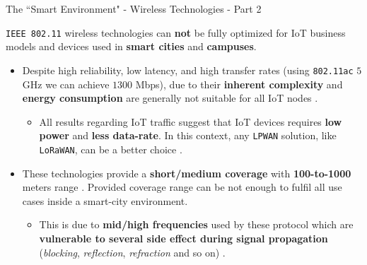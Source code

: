 \documentclass[13.5pt]{beamer}
\begin{document}
\begin{frame}{The ``Smart Environment" - Wireless Technologies - Part 2}

\begin{block}{}
\justifying

\texttt{IEEE 802.11} wireless technologies can \textbf{not} be fully optimized for IoT business models and devices used in \textbf{smart cities} and \textbf{campuses}.
\end{block}

\begin{itemize}
\justifying
\item Despite high reliability, low latency, and high transfer rates (using \texttt{802.11ac} $5$ GHz we can achieve $1300$ Mbps), due to their \textbf{inherent complexity} and \textbf{energy consumption} are generally not suitable for all IoT nodes \cite{IOTCITY}.

\begin{itemize}
\item All results regarding IoT traffic suggest that IoT devices requires \textbf{low power} and \textbf{less data-rate}. In this context, any \texttt{LPWAN} solution, like \texttt{LoRaWAN}, can be a better choice \cite{IOTCITY}.
\end{itemize}

\item These technologies provide a \textbf{short/medium coverage} with \textbf{100-to-1000} meters range \cite{LoRaWAN}. Provided coverage range can be not enough to fulfil all use cases inside a smart-city environment.

\begin{itemize}

\item This is due to \textbf{mid/high frequencies} used by these protocol which are \textbf{vulnerable to several side effect during signal propagation} (\textit{blocking}, \textit{reflection}, \textit{refraction} and so on) \cite{schiller2003mobile}.
\end{itemize}

\end{itemize}



\end{frame} 
\end{document}
